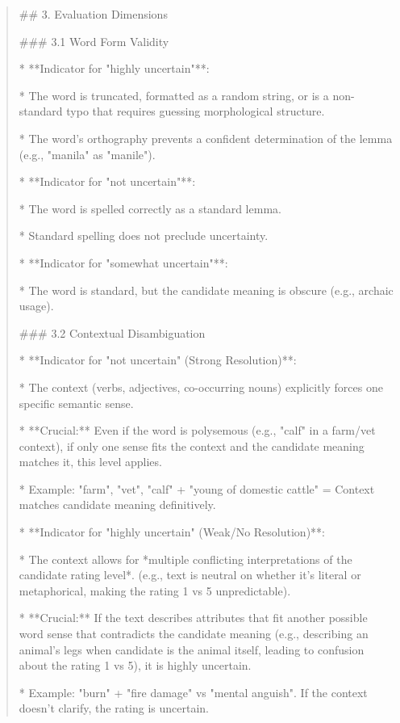 \begin{quote}
## 3. Evaluation Dimensions



### 3.1 Word Form Validity

*   **Indicator for "highly uncertain"**:

    *   The word is truncated, formatted as a random string, or is a non-standard typo that requires guessing morphological structure.

    *   The word's orthography prevents a confident determination of the lemma (e.g., "manila" as "manile").

*   **Indicator for "not uncertain"**:

    *   The word is spelled correctly as a standard lemma.

    *   Standard spelling does not preclude uncertainty.

*   **Indicator for "somewhat uncertain"**:

    *   The word is standard, but the candidate meaning is obscure (e.g., archaic usage).



### 3.2 Contextual Disambiguation

*   **Indicator for "not uncertain" (Strong Resolution)**:

    *   The context (verbs, adjectives, co-occurring nouns) explicitly forces one specific semantic sense.

    *   **Crucial:** Even if the word is polysemous (e.g., "calf" in a farm/vet context), if only one sense fits the context and the candidate meaning matches it, this level applies.

    *   Example: "farm", "vet", "calf" + "young of domestic cattle" = Context matches candidate meaning definitively.

*   **Indicator for "highly uncertain" (Weak/No Resolution)**:

    *   The context allows for *multiple conflicting interpretations of the candidate rating level*. (e.g., text is neutral on whether it's literal or metaphorical, making the rating 1 vs 5 unpredictable).

    *   **Crucial:** If the text describes attributes that fit another possible word sense that contradicts the candidate meaning (e.g., describing an animal's legs when candidate is the animal itself, leading to confusion about the rating 1 vs 5), it is highly uncertain.

    *   Example: "burn" + "fire damage" vs "mental anguish". If the context doesn't clarify, the rating is uncertain.


\end{quote}
